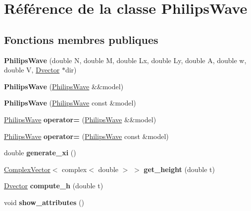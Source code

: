 \hypertarget{class_philips_wave}{}\section{Référence de la classe Philips\+Wave}
\label{class_philips_wave}
\subsection*{Fonctions membres publiques}
\begin{DoxyCompactItemize}
\item 
\mbox{\label{class_philips_wave_a12dc8ad91f043c188d8bb493302d8a38}} 
{\bfseries Philips\+Wave} (double N, double M, double Lx, double Ly, double A, double w, double V, \hyperlink{class_dvector}{Dvector} $\ast$dir)
\item 
\mbox{\label{class_philips_wave_aa560ae0388726db85b603e10ac828ceb}} 
{\bfseries Philips\+Wave} (\hyperlink{class_philips_wave}{Philips\+Wave} \&\&model)
\item 
\mbox{\label{class_philips_wave_ac1914d1a88cccc1fb4e0480374dcb6f7}} 
{\bfseries Philips\+Wave} (\hyperlink{class_philips_wave}{Philips\+Wave} const \&model)
\item 
\mbox{\label{class_philips_wave_aa186cd8f9dbd67ec4a5aaaf69c3113d0}} 
\hyperlink{class_philips_wave}{Philips\+Wave} {\bfseries operator=} (\hyperlink{class_philips_wave}{Philips\+Wave} \&\&model)
\item 
\mbox{\label{class_philips_wave_ae9d979f7458a8d33d2643a84b770bac4}} 
\hyperlink{class_philips_wave}{Philips\+Wave} {\bfseries operator=} (\hyperlink{class_philips_wave}{Philips\+Wave} const \&model)
\item 
\mbox{\label{class_philips_wave_a29cfd8f1440240b83c50e07731dfee3a}} 
double {\bfseries generate\+\_\+xi} ()
\item 
\mbox{\label{class_philips_wave_a6399084b40c8252cebe8477b3893786c}} 
\hyperlink{class_complex_vector}{Complex\+Vector}$<$ complex$<$ double $>$ $>$ {\bfseries get\+\_\+height} (double t)
\item 
\mbox{\label{class_philips_wave_adbbc60d74bf2ab81e012279df418dafb}} 
\hyperlink{class_dvector}{Dvector} {\bfseries compute\+\_\+h} (double t)
\item 
\mbox{\label{class_philips_wave_a63974a053c9795709cce3feb5cc7906c}} 
void {\bfseries show\+\_\+attributes} ()
\end{DoxyCompactItemize}


